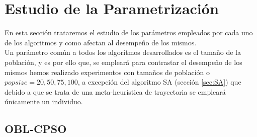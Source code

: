 \newpage
 
\section{Estudio de la Parametrización}\label{sec:PARAM}

En esta sección trataremos el estudio de los parámetros empleados por cada uno de los algoritmos y como afectan al desempeño de los mismos. \\

Un parámetro común a todos los algoritmos desarrollados es el tamaño de la población, y es por ello que, se empleará para contrastar el desempeño de los mismos hemos realizado experimentos con tamaños de población o $popsize = 20, 50, 75, 100$, a excepción del algoritmo SA (sección \ref{sec:SA}) que debido a que se trata de una meta-heurística de trayectoria se empleará únicamente un individuo.

\subsection{OBL-CPSO}\label{sec:paramOBL_CPSO}

